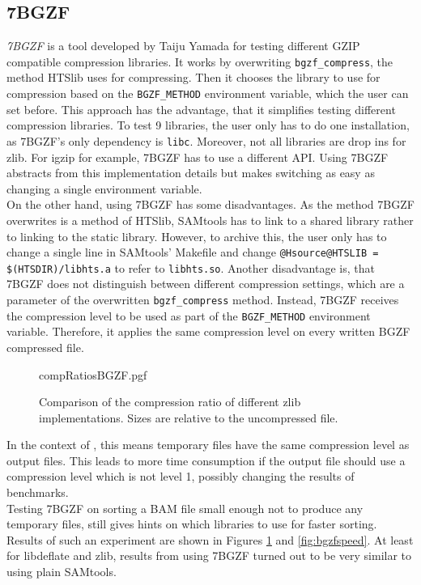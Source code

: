 \subsection{7BGZF}
\textit{7BGZF} \cite{yamada_7bgzf_2020} is a tool developed by Taiju Yamada for testing different GZIP compatible compression libraries. It works by overwriting \texttt{bgzf\_compress}, the method HTSlib uses for compressing. Then it chooses the library to use for compression based on the \texttt{BGZF\_METHOD} environment variable, which the user can set before. This approach has the advantage, that it simplifies testing different compression libraries. 
To test 9 libraries, the user only has to do one installation, as 7BGZF's only dependency is \texttt{libc}. Moreover, not all libraries are drop ins for zlib. For igzip for example, 7BGZF has to use a different API. Using 7BGZF abstracts from this implementation details but makes switching as easy as changing a single environment variable.\\
On the other hand, using 7BGZF has some disadvantages. As the method 7BGZF overwrites is a method of HTSlib, SAMtools has to link to a shared library rather to linking to the static library. However, to archive this, the user only has to change a single line in SAMtools' Makefile and change \texttt{@Hsource@HTSLIB = \$(HTSDIR)/libhts.a} to refer to \texttt{libhts.so}. Another disadvantage is, that 7BGZF does not distinguish between different compression settings, which are a parameter of the overwritten \texttt{bgzf\_compress} method. Instead, 7BGZF receives the compression level to be used as part of the \texttt{BGZF\_METHOD} environment variable. Therefore, it applies the same compression level on every written BGZF compressed file. 
\begin{figure}
        {compRatiosBGZF.pgf}
    \caption{Comparison of the compression ratio of different zlib implementations. Sizes are relative to the uncompressed file.}
    \label{fig:bgzfComps}
\end{figure}
In the context of \sort, this means temporary files have the same compression level as output files. This leads to more time consumption if the output file should use a compression level which is not level 1, possibly changing the results of benchmarks. \\
Testing 7BGZF on sorting a BAM file small enough not to produce any temporary files, still gives hints on which libraries to use for faster sorting. Results of such an experiment are shown in Figures \ref{fig:bgzfComps} and \ref{fig:bgzfspeed}. At least for libdeflate and zlib, results from using 7BGZF turned out to be very similar to using plain SAMtools.
